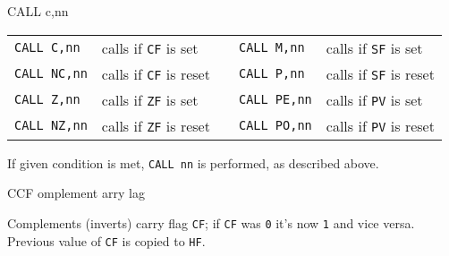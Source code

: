\begin{basedescript}{
    \desclabelstyle{\multilinelabel}
    \desclabelwidth{3cm}}
\begin{DetailItem}{CALL c,nn}
        \vspace{1ex} %
        \begin{tabular}{@{}llcll}			
            {\tt CALL C,nn} & calls if {\tt CF} is set & &
                {\tt CALL M,nn} & calls if {\tt SF} is set\\
            {\tt CALL NC,nn} & calls if {\tt CF} is reset & &
                {\tt CALL P,nn} & calls if {\tt SF} is reset\\
            {\tt CALL Z,nn} & calls if {\tt ZF} is set & &
                {\tt CALL PE,nn} & calls if {\tt PV} is set\\
            {\tt CALL NZ,nn} & calls if {\tt ZF} is reset & &
                {\tt CALL PO,nn} & calls if {\tt PV} is reset\\
        \end{tabular}

        If given condition is met, {\tt CALL nn} is performed, as described above.

        \begin{DetailEffects}
            \FlagsCALLccnn
        \end{DetailEffects}

        \begin{DetailTiming}
        \end{DetailTiming}

    \end{DetailItem}

    \begin{DetailItem}{CCF}
        {omplement arry lag}
        {\SymCCF}

        Complements (inverts) carry flag {\tt CF}; if {\tt CF} was {\tt 0} it's now {\tt 1} and vice versa. Previous value of {\tt CF} is copied to {\tt HF}.

        \begin{DetailEffects}
            \FlagsCCF
        \end{DetailEffects}
		
        \begin{DetailTiming}
        \end{DetailTiming}


\end{DetailItem}
\end{basedescript}
